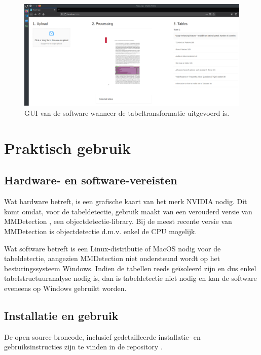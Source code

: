 \begin{figure}[H]
    \centering
    \includegraphics[width=1\textwidth]{img/gui_screenshot_used.png}
    \caption{GUI van de software wanneer de tabeltransformatie uitgevoerd is.}
    \label{fig:gui-screenshot-used}
\end{figure}

\section{Praktisch gebruik}
\label{sec:praktisch-gebruik}

\subsection{Hardware- en software-vereisten}
\label{subsec:hardware-en-software-vereisten}

Wat hardware betreft, is een grafische kaart van het merk NVIDIA nodig. Dit komt omdat, voor de tabeldetectie, \textcite{Prasad2020} gebruik maakt van een verouderd versie van MMDetection \autocite{Chen2019}, een objectdetectie-library. Bij de meest recente versie van MMDetection is objectdetectie d.m.v. enkel de CPU mogelijk. 

Wat software betreft is een Linux-distributie of MacOS nodig voor de tabeldetectie, aangezien MMDetection niet ondersteund wordt op het besturingssysteem Windows. Indien de tabellen reeds geïsoleerd zijn en dus enkel tabelstructuuranalyse nodig is, dan is tabeldetectie niet nodig en kan de software eveneens op Windows gebruikt worden.

\subsection{Installatie en gebruik}
\label{subsec:installatie-en-gebruik}

De open source broncode, inclusief gedetailleerde installatie- en gebruiksinstructies zijn te vinden in de repository \textcite{Nazari2020}.
